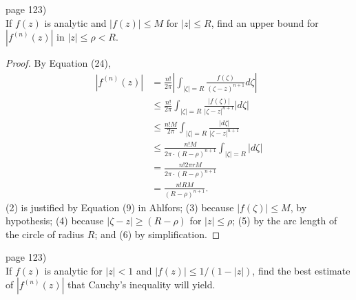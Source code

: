 \documentclass{article}
\newenvironment{problem}[2][Problem]{\begin{trivlist}
\item[\hskip \labelsep {\bfseries #1}\hskip \labelsep {\bfseries #2.}]}{\end{trivlist}}
\begin{document}
\pagebreak

\begin{problem}{3} (page 123) \\
  If $f(z)$ is analytic and $|f(z)| \leq M$ for $|z| \leq R$, find an upper
  bound for $|f^{(n)}(z)|$ in $|z| \leq \rho < R$.
\end{problem}

\begin{proof}
  By Equation (24), \begin{align}
    |f^{(n)}(z)|
    &= \frac{n!}{2\pi}\left|\int_{|\zeta| = R} \frac{f(\zeta)}{(\zeta - z)^{n+1}}d\zeta\right|\\
    &\leq \frac{n!}{2\pi}\int_{|\zeta| = R} \frac{|f(\zeta)|}{|\zeta - z|^{n+1}}|d\zeta|\\
    &\leq \frac{n!M}{2\pi}\int_{|\zeta| = R} \frac{|d\zeta|}{|\zeta - z|^{n+1}}\\
    &\leq \frac{n!M}{2\pi\cdot(R-\rho)^{n+1}}\int_{|\zeta| = R} |d\zeta|\\
    &= \frac{n!2\pi rM}{2\pi\cdot(R-\rho)^{n+1}} \\
    &= \frac{n!RM}{(R-\rho)^{n+1}}.
  \end{align}
  (2) is justified by Equation (9) in Ahlfors;
  (3) because $|f(\zeta)| \leq M$, by hypothesis;
  (4) because $|\zeta - z| \geq (R-\rho)$ for $|z| \leq \rho$;
  (5) by the arc length of the circle of radius $R$; and (6) by simplification.
\end{proof}

\pagebreak

\begin{problem}{4} (page 123) \\
  If $f(z)$ is analytic for $|z| < 1$ and $|f(z)| \leq 1/(1-|z|)$, find the best
  estimate of $|f^{(n)}(z)|$ that Cauchy's inequality will yield.
\end{problem}
\end{document}
